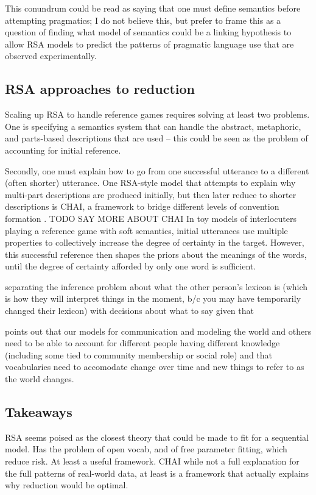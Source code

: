 \documentclass[]{article}
\begin{document}
This conundrum could be read as saying that one must define semantics before attempting pragmatics; I do not believe this, but prefer to frame this as a question of finding what model of semantics could be a linking hypothesis to allow RSA models to predict the patterns of pragmatic language use that are observed experimentally. 


\subsection{RSA approaches to reduction}
Scaling up RSA to handle reference games requires solving at least two problems. One is specifying a semantics system that can handle the abstract, metaphoric, and parts-based descriptions that are used -- this could be seen as the problem of accounting for initial reference. 

Secondly, one must explain how to go from one successful utterance to a different (often shorter) utterance. One RSA-style model that attempts to explain why multi-part descriptions are produced initially, but then later reduce to shorter descriptions is CHAI,  a framework to bridge different levels of convention formation \cite{hawkins2021}. TODO SAY MORE ABOUT CHAI In toy models of interlocuters playing a reference game with soft semantics, initial utterances use multiple properties to collectively increase the degree of certainty in the target. However, this successful reference then shapes the priors about the meanings of the words, until the degree of certainty afforded by only one word is sufficient. 

\cite{hawkins2021} separating the inference problem about what the other person's lexicon is (which is how they will interpret things in the moment, b/c you may have temporarily changed their lexicon) with decisions about what to say given that 

\cite{hawkins2021} points out that our models for communication and modeling the world and others need to be able to account for different people having different knowledge (including some tied to community membership or social role) and that vocabularies need to accomodate change over time and new things to refer to as the world changes. 

\subsection{Takeaways}
RSA seems poised as the closest theory that could be made to fit for a sequential model. Has the problem of open vocab, and of free parameter fitting, which reduce risk. At least a useful framework. 
CHAI while not a full explanation for the full patterns of real-world data, at least is a framework that actually explains why reduction would be optimal. 
\end{document}
